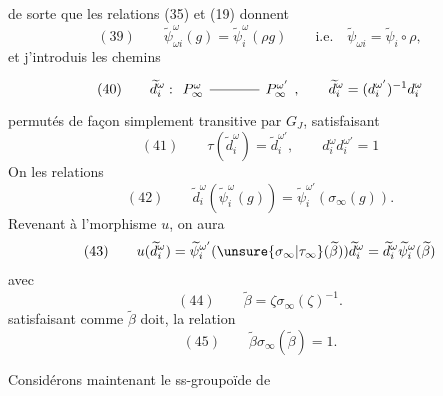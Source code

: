 de sorte que les relations (35) et (19) donnent
\[
(39)\qquad \widetilde\psi_{\omega i}^\omega(g)=\widetilde\psi_i^\omega(\rho g)
\qquad\text{i.e.}\quad\widetilde\psi_{\omega i}=\widetilde\psi_i\circ\rho,
\]
et j'introduis les chemins
\[
(40)\qquad\widetilde d_i^\omega:
\begin{tikzcd}[ampersand replacement=\&,column sep=large]
P_{\infty}^\omega\arrow[r,no head]\&P_{\infty}^{\omega'}
\end{tikzcd},\qquad
\widetilde d_i^\omega=(d_i^{\omega'})^{-1}d_i^\omega
\]
permutés de façon simplement transitive par $G_J$,
 satisfaisant
\[
(41)\qquad\tau(\widetilde d_i^\omega)=\widetilde d_i^{\omega'},\qquad
 d_i^\omega d_i^{\omega'}=1
\]
On   les relations
\[
(42)\qquad\widetilde d_i^\omega(\widetilde\psi_i^\omega(g))=
\widetilde\psi_i^{\omega'}(\sigma_\infty(g)).
\]
Revenant à l'morphisme $u$, on aura 
\[
(43)\qquad u(\widetilde d_i^\omega)=\widetilde\psi_i^{\omega'}(\unsure{\sigma_\infty|\tau_\infty}(\widetilde\beta))\widetilde d_i^\omega
=\widetilde d_i^\omega\widetilde\psi_i^\omega(\widetilde\beta)
\]
avec
\[
(44)\qquad\widetilde\beta=\zeta\sigma_\infty(\zeta)^{-1}.
\]
satisfaisant   comme $\widetilde\beta$ doit, la relation
\[
(45)\qquad\widetilde\beta\sigma_\infty(\widetilde\beta)=1.
\]

Considérons maintenant le ss-groupoïde de

